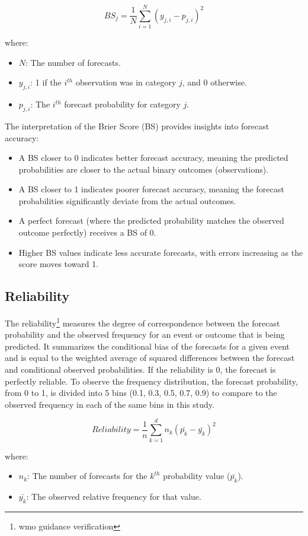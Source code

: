 \[
BS_j = \frac{1}{N} \sum_{i=1}^{N} (y_{j,i} - p_{j,i})^2
\]

where:  
\begin{itemize}
    \item \( N \): The number of forecasts.  
    \item \( y_{j,i} \): 1 if the \( i^{th} \) observation was in category \( j \), and 0 otherwise.  
    \item \( p_{j,i} \): The \( i^{th} \) forecast probability for category \( j \).  
\end{itemize}

The interpretation of the Brier Score (BS) provides insights into forecast accuracy:  
\begin{itemize}
    \item A BS closer to 0 indicates better forecast accuracy, meaning the predicted probabilities are closer to the actual binary outcomes (observations).  
    \item A BS closer to 1 indicates poorer forecast accuracy, meaning the forecast probabilities significantly deviate from the actual outcomes.  
    \item A perfect forecast (where the predicted probability matches the observed outcome perfectly) receives a BS of 0.  
    \item Higher BS values indicate less accurate forecasts, with errors increasing as the score moves toward 1.  
\end{itemize}


\subsection{Reliability}
The reliability\footnote{wmo guidance verification} measures the degree of correspondence between the forecast probability and the observed frequency for an event or outcome that is being predicted. It summarizes the conditional bias of the forecasts for a given event and is equal to the weighted average of squared differences between the forecast and conditional observed probabilities. If the reliability is 0, the forecast is perfectly reliable. To observe the frequency distribution, the forecast probability, from 0 to 1, is divided into 5 bins (0.1, 0.3, 0.5, 0.7, 0.9) to compare to the observed frequency in each of the same bins in this study.

\[
Reliability = \frac{1}{n} \sum_{k=1}^{d} n_k (\bar{p_k} - \bar{y_k})^2
\]

where:  
\begin{itemize}
    \item \( n_k \): The number of forecasts for the \( k^{th} \) probability value (\( \bar{p_k} \)).  
    \item \( \bar{y_k} \): The observed relative frequency for that value.  
\end{itemize}

